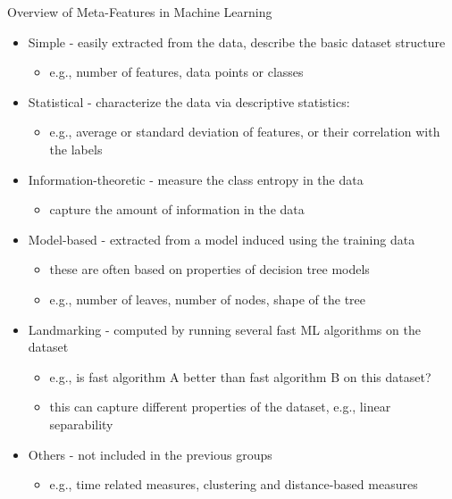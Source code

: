 \begin{frame}[c]{Overview of Meta-Features in Machine Learning}

\begin{itemize}
	\item \alert{Simple} - easily extracted from the data, describe the basic dataset structure
	\begin{itemize}
		\item e.g., number of features, data points or classes
		\pause
	\end{itemize}
	
	\item \alert{Statistical} - characterize the data via descriptive statistics:
	\begin{itemize}
		\item e.g., average or standard deviation of features, or their correlation with the labels
		\pause
	\end{itemize} 	
	\item \alert{Information-theoretic} - measure the class entropy in the data
	\begin{itemize}
		\item capture the amount of information in the data %
		\pause 
    \end{itemize}
    \item \alert{Model-based} - extracted from a model induced using the training data
    \begin{itemize}
    	\item these are often based on properties of decision tree models
    	\item e.g., number of leaves, number of nodes, shape of the tree 
    	\pause
	\end{itemize}	
	\item \alert{Landmarking} - computed by running several fast ML algorithms on the dataset
	\begin{itemize}
		\item e.g., is fast algorithm A better than fast algorithm B on this dataset?
		\item this can capture different properties of the dataset, e.g., linear separability
		\pause
	\end{itemize}
	\item \alert{Others} - not included in the previous groups
	\begin{itemize}
		\item e.g., time related measures, clustering and distance-based measures
	\end{itemize}
	
\end{itemize}

\end{frame}
